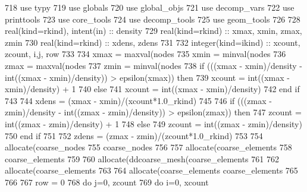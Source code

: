 \begin{DoxyCode}
718       \textcolor{keywordtype}{use }typy
719       \textcolor{keywordtype}{use }globals
720       \textcolor{keywordtype}{use }global_objs
721       \textcolor{keywordtype}{use }decomp_vars
722       \textcolor{keywordtype}{use }printtools
723       \textcolor{keywordtype}{use }core_tools
724       \textcolor{keywordtype}{use }decomp_tools
725       \textcolor{keywordtype}{use }geom_tools
726       
728       \textcolor{keywordtype}{real(kind=rkind)}, \textcolor{keywordtype}{intent(in)} :: density
729       \textcolor{keywordtype}{real(kind=rkind)} :: xmax, xmin, zmax, zmin
730       \textcolor{keywordtype}{real(kind=rkind)} :: xdens, zdens
731 
732       \textcolor{keywordtype}{integer(kind=ikind)} :: xcount, zcount, i,j, row
733 
734       xmax = maxval(nodes%
735       xmin = minval(nodes%
736       zmax = maxval(nodes%
737       zmin = minval(nodes%
738       \textcolor{keywordflow}{if} (((xmax - xmin)/density - int((xmax - xmin)/density)) > epsilon\textcolor{comment}{(xmax)) }\textcolor{keywordflow}{then}
739         xcount = int((xmax - xmin)/density) + 1
740       \textcolor{keywordflow}{else}
741         xcount = int((xmax - xmin)/density)
742 \textcolor{keywordflow}{      end if}
743 
744       xdens = (xmax - xmin)/(xcount*1.0\_rkind)
745  
746       \textcolor{keywordflow}{if} (((zmax - zmin)/density - int((zmax - zmin)/density)) > epsilon\textcolor{comment}{(zmax)) }\textcolor{keywordflow}{then}
747         zcount = int((zmax - zmin)/density) + 1
748       \textcolor{keywordflow}{else}
749         zcount = int((zmax - zmin)/density)
750 \textcolor{keywordflow}{      end if}
751 
752       zdens = (zmax - zmin)/(zcount*1.0\_rkind)
753       
754       \textcolor{keyword}{allocate}(coarse_nodes%
755       coarse_nodes%
756 
757       \textcolor{keyword}{allocate}(coarse_elements%
758       coarse_elements%
759 
760       \textcolor{keyword}{allocate}(ddcoarse_mesh(coarse_elements%
761       
762       \textcolor{keyword}{allocate}(coarse_elements%
763       
764       \textcolor{keyword}{allocate}(coarse_elements%
      coarse_elements%
765 \textcolor{comment}{}
766 \textcolor{comment}{}
767 \textcolor{comment}{      row = 0}
768 \textcolor{comment}{      }\textcolor{keywordflow}{do} j=0, zcount
769         \textcolor{keywordflow}{do} i=0, xcount

\end{DoxyCode}
